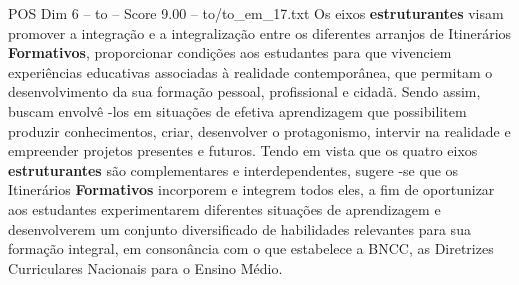 \begin{textsample}{POS Dim 6 – to – Score 9.00 – to/to\_em\_17.txt}  \label{ex:f6_pos_173}
Os eixos \textbf{estruturantes} visam promover a integração e a integralização entre os diferentes arranjos de Itinerários \textbf{Formativos}, proporcionar condições aos estudantes para que vivenciem experiências educativas associadas à realidade contemporânea, que permitam o desenvolvimento da sua formação pessoal, profissional e cidadã.
Sendo assim, buscam envolvê -los em situações de efetiva aprendizagem que possibilitem produzir conhecimentos, criar, desenvolver o protagonismo, intervir na realidade e empreender projetos presentes e futuros.
Tendo em vista que os quatro eixos \textbf{estruturantes} são complementares e interdependentes, sugere -se que os Itinerários \textbf{Formativos} incorporem e integrem todos eles, a fim de oportunizar aos estudantes experimentarem diferentes situações de aprendizagem e desenvolverem um conjunto diversificado de habilidades relevantes para sua formação integral, em consonância com o que estabelece a BNCC, as Diretrizes Curriculares Nacionais para o Ensino Médio.

\end{textsample}
